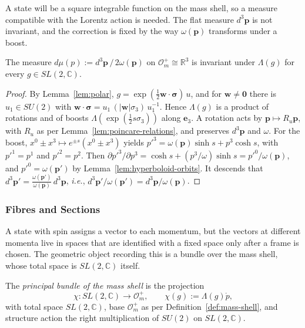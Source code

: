 A state will be a square integrable function on the mass shell, so a measure compatible with the Lorentz action is needed. The flat measure $d^3\mathbf{p}$ is not invariant, and the correction is fixed by the way $\omega(\mathbf{p})$ transforms under a boost.

\begin{lemma}\label{lem:invariant-measure}
	The measure $d\mu(p):=d^3\mathbf{p}\,/\,2\omega(\mathbf{p})$ on $\mathcal{O}_m^+\cong\mathbb{R}^3$ is invariant under $\Lambda(g)$ for every $g\in SL(2,\mathbb{C})$.
\end{lemma}

\begin{proof}
	By Lemma~\ref{lem:polar}, $g=\exp(\tfrac12\mathbf{w}\cdot\boldsymbol{\sigma})\,u$, and for $\mathbf{w}\neq\mathbf{0}$ there is $u_1\in SU(2)$ with $\mathbf{w}\cdot\boldsymbol{\sigma}=u_1\,(|\mathbf{w}|\sigma_3)\,u_1^{-1}$. Hence $\Lambda(g)$ is a product of rotations and of boosts $\Lambda(\exp(\tfrac12 s\sigma_3))$ along $\mathbf{e}_3$. A rotation acts by $\mathbf{p}\mapsto R_u\mathbf{p}$, with $R_u$ as per Lemma~\ref{lem:poincare-relations}, and preserves $d^3\mathbf{p}$ and $\omega$. For the boost, $x^0\pm x^3\mapsto e^{\pm s}(x^0\pm x^3)$ yields $p'^3=\omega(\mathbf{p})\sinh s+p^3\cosh s$, with $p'^1=p^1$ and $p'^2=p^2$. Then $\partial p'^3/\partial p^3=\cosh s+(p^3/\omega)\sinh s=p'^0/\omega(\mathbf{p})$, and $p'^0=\omega(\mathbf{p}')$ by Lemma~\ref{lem:hyperboloid-orbits}. It descends that $d^3\mathbf{p}'=\tfrac{\omega(\mathbf{p}')}{\omega(\mathbf{p})}\,d^3\mathbf{p}$, \textit{i.e.}, $d^3\mathbf{p}'/\omega(\mathbf{p}')=d^3\mathbf{p}/\omega(\mathbf{p})$.
\end{proof}

\subsubsection*{Fibres and Sections}

A state with spin assigns a vector to each momentum, but the vectors at different momenta live in spaces that are identified with a fixed space only after a frame is chosen. The geometric object recording this is a bundle over the mass shell, whose total space is $SL(2,\mathbb{C})$ itself.

\begin{definition}\label{def:principal-bundle}
	The \emph{principal bundle of the mass shell} is the projection
	\begin{equation*}
		\chi:SL(2,\mathbb{C})\to\mathcal{O}_m^+,\qquad\chi(g):=\Lambda(g)\mathring{p},
	\end{equation*}
	with total space $SL(2,\mathbb{C})$, base $\mathcal{O}_m^+$ as per Definition~\ref{def:mass-shell}, and structure action the right multiplication of $SU(2)$ on $SL(2,\mathbb{C})$.
\end{definition}

